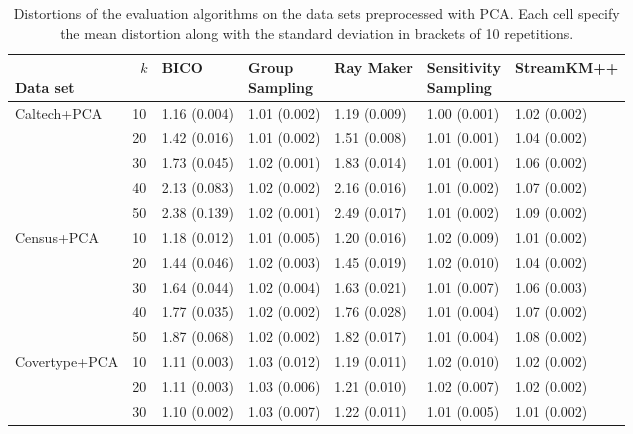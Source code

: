 \begin{table}[ht]
\centering
\caption{Distortions of the evaluation algorithms on the data sets preprocessed with PCA. Each cell specify the mean distortion along with the standard deviation in brackets of 10 repetitions.}
\label{tab:distortions-mean-std-with-pca}
\begin{tabular}{lllllll}
\toprule
\parbox[t]{2cm}{\ \\Data set}  & \parbox[t]{5mm}{\ \\$k$} &           BICO & \parbox[t]{1cm}{Group\\Sampling} &      Ray Maker & \parbox[t]{1cm}{Sensitivity\\Sampling} &    StreamKM++ \\
\midrule
Caltech+PCA & 10  &   1.16 (0.004) &   1.01 (0.002) &   1.19 (0.009) &         1.00 (0.001) &  1.02 (0.002) \\
      & 20  &   1.42 (0.016) &   1.01 (0.002) &   1.51 (0.008) &         1.01 (0.001) &  1.04 (0.002) \\
      & 30  &   1.73 (0.045) &   1.02 (0.001) &   1.83 (0.014) &         1.01 (0.001) &  1.06 (0.002) \\
      & 40  &   2.13 (0.083) &   1.02 (0.002) &   2.16 (0.016) &         1.01 (0.002) &  1.07 (0.002) \\
      & 50  &   2.38 (0.139) &   1.02 (0.001) &   2.49 (0.017) &         1.01 (0.002) &  1.09 (0.002) \\
\midrule
Census+PCA & 10  &   1.18 (0.012) &   1.01 (0.005) &   1.20 (0.016) &         1.02 (0.009) &  1.01 (0.002) \\
      & 20  &   1.44 (0.046) &   1.02 (0.003) &   1.45 (0.019) &         1.02 (0.010) &  1.04 (0.002) \\
      & 30  &   1.64 (0.044) &   1.02 (0.004) &   1.63 (0.021) &         1.01 (0.007) &  1.06 (0.003) \\
      & 40  &   1.77 (0.035) &   1.02 (0.002) &   1.76 (0.028) &         1.01 (0.004) &  1.07 (0.002) \\
      & 50  &   1.87 (0.068) &   1.02 (0.002) &   1.82 (0.017) &         1.01 (0.004) &  1.08 (0.002) \\
\midrule
Covertype+PCA & 10  &   1.11 (0.003) &   1.03 (0.012) &   1.19 (0.011) &         1.02 (0.010) &  1.02 (0.002) \\
      & 20  &   1.11 (0.003) &   1.03 (0.006) &   1.21 (0.010) &         1.02 (0.007) &  1.02 (0.002) \\
      & 30  &   1.10 (0.002) &   1.03 (0.007) &   1.22 (0.011) &         1.01 (0.005) &  1.01 (0.002) \\

\end{tabular}
\end{table}
